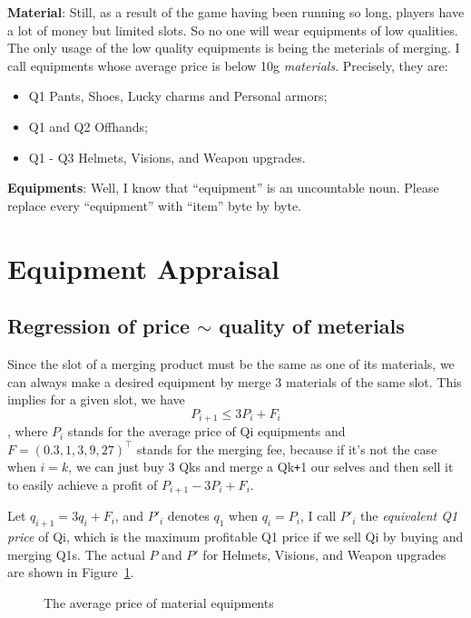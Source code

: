 \documentclass{manuscript}
\begin{document}
    \textbf{Material}: Still, as a result of the game having been running so long, players have a lot of money but limited
    slots. So no one will wear equipments of low qualities. The only usage of the low quality equipments is being the
    meterials of merging. I call equipments whose average price is below 10g \textit{materials}. Precisely, they are:
    \begin{itemize}[nosep]
        \item Q1 Pants, Shoes, Lucky charms and Personal armors;
        \item Q1 and Q2 Offhands;
        \item Q1 - Q3 Helmets, Visions, and Weapon upgrades.
    \end{itemize}

    \textbf{Equipments}: Well, I know that ``equipment'' is an uncountable noun. Please replace every ``equipment''
    with ``item'' byte by byte.

    \section{Equipment Appraisal}

    \subsection{Regression of price $\sim$ quality of meterials}

    Since the slot of a merging product must be the same as one of its materials, we can always make a desired equipment
    by merge 3 materials of the same slot. This implies for a given slot, we have
        $$ P_{i+1} \leqslant 3P_{i} + F_{i} $$,
    where $P_i$ stands for the average price of Qi equipments and $F = (0.3, 1, 3, 9, 27)^\intercal$ stands for the merging
    fee, because if it's not the case when $i = k$, we can just buy 3 Qks and merge a Qk\verb!+!1 our selves and then sell
    it to easily achieve a profit of $P_{i+1} - 3P_{i} + F_{i}$.

    Let $q_{i+1} = 3q_{i} + F_{i}$, and $P'_i$ denotes $q_1$ when $q_i = P_i$, I call $P'_i$ the \textit{equivalent Q1 price}
    of Qi, which is the maximum profitable Q1 price if we sell Qi by buying and merging Q1s. The actual $P$ and $P'$
    for Helmets, Visions, and Weapon upgrades are shown in Figure~\ref{fig:reg_price_quality}.

    \begin{figure}[ht]
        \centering
        
        \caption{The average price of material equipments}\label{fig:reg_price_quality}
    \end{figure}
\end{document}
